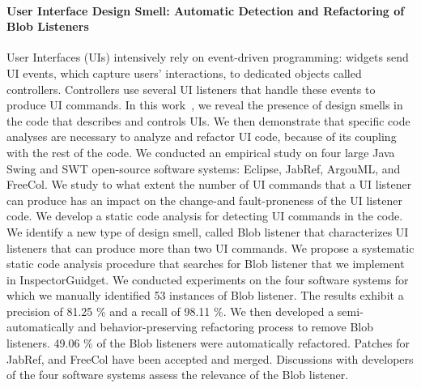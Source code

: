 \paragraph{User Interface Design Smell: Automatic Detection and Refactoring of Blob Listeners}

User Interfaces (UIs) intensively rely on event-driven programming: widgets send UI events, which capture users' interactions, to dedicated objects called controllers. Controllers use several UI listeners that handle these events to produce UI commands. In this work~\cite{blouin:hal-01499106}, we reveal the presence of design smells in the code that describes and controls UIs. We then demonstrate that specific code analyses are necessary to analyze and refactor UI code, because of its coupling with the rest of the code. We conducted an empirical study on four large Java Swing and SWT open-source software systems: Eclipse, JabRef, ArgouML, and FreeCol. We study to what extent the number of UI commands that a UI listener can produce has an impact on the change-and fault-proneness of the UI listener code. We develop a static code analysis for detecting UI commands in the code. We identify a new type of design smell, called Blob listener that characterizes UI listeners that can produce more than two UI commands. We propose a systematic static code analysis procedure that searches for Blob listener that we implement in InspectorGuidget. We conducted experiments on the four software systems for which we manually identified 53 instances of Blob listener. The results exhibit a precision of 81.25 \% and a recall of 98.11 \%. We then developed a semi-automatically and behavior-preserving refactoring process to remove Blob listeners. 49.06 \% of the Blob listeners were automatically refactored. Patches for JabRef, and FreeCol have been accepted and merged. Discussions with developers of the four software systems assess the relevance of the Blob listener.






